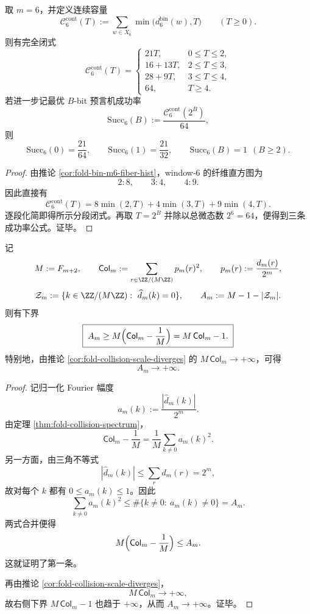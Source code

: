 \begin{corollary}\label{cor:conclusion-window6-continuous-capacity-piecewise-closed}
取 \(m=6\)，并定义连续容量
\[
\mathcal C_6^{\mathrm{cont}}(T):=\sum_{w\in X_6}\min\bigl(d_6^{\mathrm{bin}}(w),T\bigr)
\qquad(T\ge 0).
\]
则有完全闭式
\[
\boxed{\;
\mathcal C_6^{\mathrm{cont}}(T)=
\begin{cases}
21T, & 0\le T\le 2,\\[2pt]
16+13T, & 2\le T\le 3,\\[2pt]
28+9T, & 3\le T\le 4,\\[2pt]
64, & T\ge 4.
\end{cases}\;}
\]
若进一步记最优 \(B\)-bit 预言机成功率
\[
\mathrm{Succ}_6(B):=\frac{\mathcal C_6^{\mathrm{cont}}(2^B)}{64},
\]
则
\[
\boxed{\;
\mathrm{Succ}_6(0)=\frac{21}{64},
\qquad
\mathrm{Succ}_6(1)=\frac{21}{32},
\qquad
\mathrm{Succ}_6(B)=1\ \ (B\ge 2).\;}
\]
\end{corollary}
\begin{proof}
由推论 \ref{cor:fold-bin-m6-fiber-hist}，window-\(6\) 的纤维直方图为
\[
2:8,\qquad 3:4,\qquad 4:9.
\]
因此直接有
\[
\mathcal C_6^{\mathrm{cont}}(T)
=
8\min(2,T)+4\min(3,T)+9\min(4,T).
\]
逐段化简即得所示分段闭式。再取 \(T=2^B\) 并除以总微态数 \(2^6=64\)，便得到三条成功率公式。证毕。
\end{proof}

\begin{theorem}\label{thm:conclusion-foldbin-active-fourier-modes-diverge}
记
\[
M:=F_{m+2},
\qquad
\mathsf{Col}_m:=\sum_{r\in \ZZ/(M\ZZ)}p_m(r)^2,
\qquad
p_m(r):=\frac{d_m(r)}{2^m},
\]
\[
\mathcal Z_m:=\{k\in \ZZ/(M\ZZ):\ \widehat d_m(k)=0\},
\qquad
A_m:=M-1-|\mathcal Z_m|.
\]
则有下界
\[
\boxed{\;
A_m\ge M\Bigl(\mathsf{Col}_m-\frac1M\Bigr)
=M\,\mathsf{Col}_m-1.\;}
\]
特别地，由推论 \ref{cor:fold-collision-scale-diverges} 的 \(M\,\mathsf{Col}_m\to+\infty\)，可得
\[
\boxed{\;
A_m\longrightarrow +\infty.\;}
\]
\end{theorem}
\begin{proof}
记归一化 Fourier 幅度
\[
a_m(k):=\frac{|\widehat d_m(k)|}{2^m}.
\]
由定理 \ref{thm:fold-collision-spectrum}，
\[
\mathsf{Col}_m-\frac1M
=
\frac1M\sum_{k\ne 0}a_m(k)^2.
\]
另一方面，由三角不等式
\[
|\widehat d_m(k)|
\le \sum_r d_m(r)
=2^m,
\]
故对每个 \(k\) 都有 \(0\le a_m(k)\le 1\)。因此
\[
\sum_{k\ne 0}a_m(k)^2
\le
\#\{k\ne 0:\ a_m(k)\ne 0\}
=
A_m.
\]
两式合并便得
\[
M\Bigl(\mathsf{Col}_m-\frac1M\Bigr)\le A_m.
\]
这就证明了第一条。

再由推论 \ref{cor:fold-collision-scale-diverges}，
\[
M\,\mathsf{Col}_m\longrightarrow +\infty,
\]
故右侧下界 \(M\,\mathsf{Col}_m-1\) 也趋于 \(+\infty\)，从而 \(A_m\to+\infty\)。证毕。
\end{proof}

